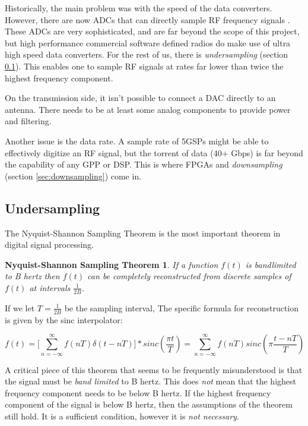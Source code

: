 \documentclass[a4paper, 12pt]{article}
\newtheorem{thm:NSST}{Nyquist-Shannon Sampling Theorem}
\begin{document}
Historically, the main problem was with the speed of the data converters.  However, there are now ADCs that can directly sample RF frequency signals \cite{gsps_adc}.  These ADCs are very sophisticated, and are far beyond the scope of this project, but high performance commercial software defined radios do make use of ultra high speed data converters.  For the rest of us, there is \textit{undersampling} (section \ref{sec:undersampling}).  This enables one to sample RF signals at rates far lower than twice the highest frequency component.

On the transmission side, it isn't possible to connect a DAC directly to an antenna.  There needs to be at least some analog components to provide power and filtering.

Another issue is the data rate.  A sample rate of 5GSPs might be able to effectively digitize an RF signal, but the torrent of data (40+ Gbps) is far beyond the capability of any GPP or DSP.  This is where FPGAs and \textit{downsampling} (section \ref{sec:downsampling}) come in.

\subsection{Undersampling}
\label{sec:undersampling}
The Nyquist-Shannon Sampling Theorem is the most important theorem in digital signal processing.

\begin{thm:NSST}
\label{thm:NSST}
  If a function $f(t)$ is bandlimited to B hertz then $f(t)$ can be completely reconstructed from discrete samples of $f(t)$ at intervals $\frac{1}{2B}$.
\end{thm:NSST}

If we let $T = \frac{1}{2B}$ be the sampling interval, The specific formula for reconstruction is given by the sinc interpolator:

\begin{equation}
\label{eq:sinc_interpolation}
f(t) = \Big[\sum_{n=-\infty}^{\infty}{f(nT)\delta(t - nT)\Big]}*sinc(\frac{\pi t}{T}) = \sum_{n=-\infty}^{\infty}{f(nT)sinc(\pi\frac{t - nT}{T})}
\end{equation}

A critical piece of this theorem that seems to be frequently misunderstood is that the signal must be \textit{band limited} to B hertz.  This does \textit{not} mean that the highest frequency component needs to be below B hertz.  If the highest frequency component of the signal is below B hertz, then the assumptions of the theorem still hold.  It is a sufficient condition, however it is \textit{not necessary}.
\end{document}
